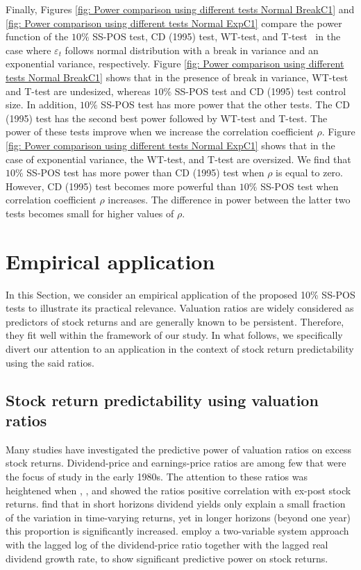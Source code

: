 \documentclass[harvard,11pt]{article}
\begin{document}
Finally, Figures \ref{fig: Power comparison using different tests Normal
BreakC1} and \ref{fig: Power comparison using different tests Normal ExpC1}
compare the power function of the $10\%$ SS-POS test, CD (1995) test, WT-test,
and T-test \ in the case where $\varepsilon _{t}$ follows normal
distribution with a break in variance and an exponential variance,
respectively. Figure \ref{fig: Power comparison using different tests
Normal BreakC1} shows that in the presence of break in variance, WT-test and
T-test are undesized, whereas $10\%$ SS-POS test and CD (1995) test control size.
In addition, $10\%$ SS-POS test has more power that the other tests. The
CD (1995) test has the second best power followed by WT-test and T-test. The
power of these tests improve when we increase the correlation coefficient $%
\rho .$ Figure \ref{fig: Power comparison using different tests Normal ExpC1}
shows that in the case of exponential variance, the WT-test, and T-test are
oversized. We find that $10\%$ SS-POS test has more power than CD (1995) test
when $\rho $ is equal to zero. However, CD (1995) test becomes more powerful than 
$10\%$ SS-POS test when correlation coefficient $\rho $ increases. The
difference in power between the latter two tests becomes small for higher
values of $\rho .$
\FloatBarrier
\section{Empirical application \label{Empirical
ApplicationC1}}
In this Section, we consider an empirical application of the proposed 10\% SS-POS tests to illustrate its practical relevance. Valuation ratios are widely considered as predictors of stock returns and are generally known to be persistent. Therefore, they fit well within the framework of our study. In what follows, we specifically divert our attention to an application in the context of stock return predictability using the said ratios.

\subsection{Stock return predictability using valuation ratios  \label{StockReturnPredictability}}

Many studies have investigated the predictive power of valuation ratios on excess stock returns. Dividend-price and earnings-price ratios
are among few that were the focus of study in the early 1980s. The attention to these ratios was heightened
 when \citet{rozeff1984dividend}, \citet{fama1988dividend}, and \citet{campbell1988dividend} showed the ratios positive correlation with ex-post stock returns. \citet{fama1988dividend} find that in short horizons dividend yields only explain a small fraction of the variation
 in time-varying returns, yet in longer horizons (beyond one year) 
this proportion is significantly increased. \citet{campbell1988dividend} employ a two-variable system approach with the lagged
log of the dividend-price ratio together with the lagged real dividend growth rate, to show significant predictive
power on stock returns. 
\end{document}
